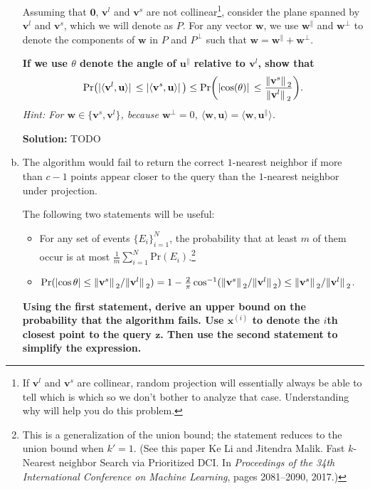 \documentclass{article}
\renewcommand{\vec}[1]{\boldsymbol{\mathbf{#1}}}
\newenvironment{solution}{\color{blue} \smallskip \textbf{Solution:}}{}
\begin{document}
\begin{enumerate}[(a)]
    Assuming that $\vec{0}$, $\vec{v}^{l}$ and $\vec{v}^{s}$ are not collinear\footnote{If $\vec{v}^{l}$ and $\vec{v}^{s}$ are collinear, random projection will essentially always be able to tell which is which so we don't bother to analyze that case. Understanding why will help you do this problem.}, consider the plane spanned by $\vec{v}^{l}$ and $\vec{v}^{s}$, which we will denote as $P$.
    For any vector $\vec{w}$, we use $\vec{w}^{\parallel}$ and $\vec{w}^{\perp}$ to denote the components of $\vec{w}$ in $P$ and $P^{\perp}$ such that $\vec{w}=\vec{w}^{\parallel}+\vec{w}^{\perp}$. 
    
    {\bf If we use $\theta$ denote the angle of $\vec{u}^{\parallel}$ relative to $\vec{v}^{l}$, show that 
    \[
        \mathrm{Pr}\qty(\abs*{\langle\vec{v}^{l}, \vec{u}\rangle} \leq \abs*{\langle\vec{v}^{s}, \vec{u}\rangle}) \leq \mathrm{Pr}\qty(\abs*{\cos(\theta)} \leq \frac{\norm*{\vec{v}^{s}}_{2}}{\norm*{\vec{v}^{l}}_{2}}).
    \]
    }
    \emph{Hint: For $\vec{w} \in \{\vec{v}^{s}, \vec{v}^{l}\}$, because $\vec{w}^{\perp} = 0$, $\langle \vec{w}, \vec{u} \rangle = \langle \vec{w}, \vec{u}^{\parallel} \rangle$.}
    
    \begin{solution}
        TODO
    \end{solution}

    \newpage
    \item
    The algorithm would fail to return the correct $1$-nearest neighbor if more than $c-1$ points appear closer to the query than the $1$-nearest neighbor under projection. 
    
    The following two statements will be useful:
    \begin{itemize}
        \item 
        For any set of events $\{E_{i}\} _{i=1}^{N}$, the probability that at least $m$ of them occur is at most $\frac{1}{m}\sum_{i=1}^{N}\mathrm{Pr}(E_{i})$.\footnote{This is a generalization of the union bound; the statement reduces to the union bound when $k'=1$. (See this paper Ke Li and Jitendra Malik. Fast $k$-Nearest neighbor Search via Prioritized DCI. In \emph{Proceedings of the 34th International Conference on Machine Learning}, pages 2081--2090, 2017.)}
        \item
        $\mathrm{Pr}(\abs{\cos\theta} \leq \norm*{\vec{v}^{s}}_{2} / \norm*{\vec{v}^{l}}_{2}) = 1 -\frac{2}{\pi}\cos^{-1}(\norm*{\vec{v}^{s}}_{2}/\norm*{\vec{v}^{l}}_{2}) \leq \norm*{\vec{v}^{s}}_{2}/\norm*{\vec{v}^{l}}_{2}$. 
    \end{itemize}
    {\bf Using the first statement, derive an upper bound on the probability that the algorithm fails. Use $\vec{x}^{(i)}$ to denote the $i$th closest point to the query $\vec{z}$. Then use the second statement to simplify the expression.}
    

\end{enumerate}
\end{document}
